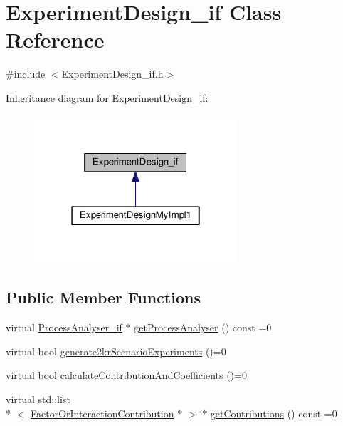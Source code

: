 \hypertarget{class_experiment_design__if}{\section{Experiment\-Design\-\_\-if Class Reference}
\label{class_experiment_design__if}
}


{\ttfamily \#include $<$Experiment\-Design\-\_\-if.\-h$>$}



Inheritance diagram for Experiment\-Design\-\_\-if\-:
\nopagebreak
\begin{figure}[H]
\begin{center}
\leavevmode
\includegraphics[width=214pt]{class_experiment_design__if__inherit__graph}
\end{center}
\end{figure}
\subsection*{Public Member Functions}
\begin{DoxyCompactItemize}
\item 
virtual \hyperlink{class_process_analyser__if}{Process\-Analyser\-\_\-if} $\ast$ \hyperlink{class_experiment_design__if_ad3d35aef077b45d683e408ee756d83aa}{get\-Process\-Analyser} () const =0
\item 
virtual bool \hyperlink{class_experiment_design__if_a590a79e47f10294ed9d806baa9a98cba}{generate2kr\-Scenario\-Experiments} ()=0
\item 
virtual bool \hyperlink{class_experiment_design__if_a5e8a8698eaf74121671dd007d7a000e9}{calculate\-Contribution\-And\-Coefficients} ()=0
\item 
virtual std\-::list\\*
$<$ \hyperlink{class_factor_or_interaction_contribution}{Factor\-Or\-Interaction\-Contribution} $\ast$ $>$ $\ast$ \hyperlink{class_experiment_design__if_a249bd184b8326ec6e161321fe6fb7dbe}{get\-Contributions} () const =0
\end{DoxyCompactItemize}


